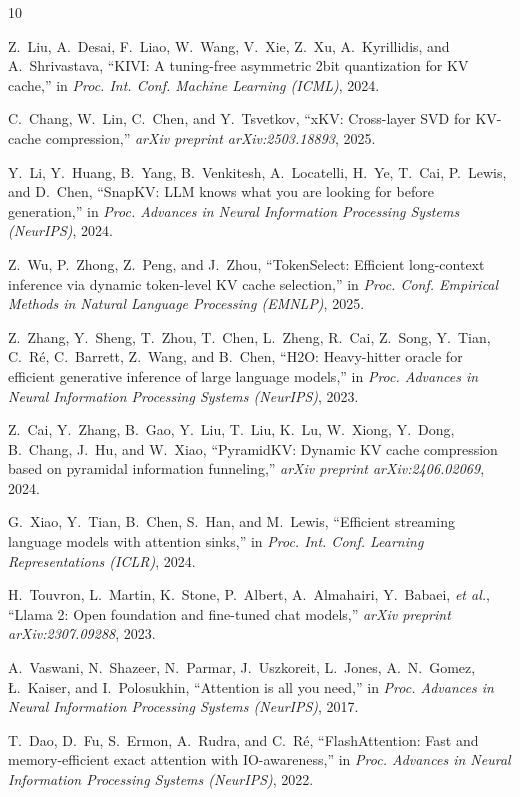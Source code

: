 \documentclass[conference]{IEEEtran}
\begin{document}
\begin{thebibliography}{10}

Z.~Liu, A.~Desai, F.~Liao, W.~Wang, V.~Xie, Z.~Xu, A.~Kyrillidis, and A.~Shrivastava, ``KIVI: A tuning-free asymmetric 2bit quantization for KV cache,'' in \textit{Proc. Int. Conf. Machine Learning (ICML)}, 2024.

C.~Chang, W.~Lin, C.~Chen, and Y.~Tsvetkov, ``xKV: Cross-layer SVD for KV-cache compression,'' \textit{arXiv preprint arXiv:2503.18893}, 2025.

Y.~Li, Y.~Huang, B.~Yang, B.~Venkitesh, A.~Locatelli, H.~Ye, T.~Cai, P.~Lewis, and D.~Chen, ``SnapKV: LLM knows what you are looking for before generation,'' in \textit{Proc. Advances in Neural Information Processing Systems (NeurIPS)}, 2024.

Z.~Wu, P.~Zhong, Z.~Peng, and J.~Zhou, ``TokenSelect: Efficient long-context inference via dynamic token-level KV cache selection,'' in \textit{Proc. Conf. Empirical Methods in Natural Language Processing (EMNLP)}, 2025.

Z.~Zhang, Y.~Sheng, T.~Zhou, T.~Chen, L.~Zheng, R.~Cai, Z.~Song, Y.~Tian, C.~R\'{e}, C.~Barrett, Z.~Wang, and B.~Chen, ``H2O: Heavy-hitter oracle for efficient generative inference of large language models,'' in \textit{Proc. Advances in Neural Information Processing Systems (NeurIPS)}, 2023.

Z.~Cai, Y.~Zhang, B.~Gao, Y.~Liu, T.~Liu, K.~Lu, W.~Xiong, Y.~Dong, B.~Chang, J.~Hu, and W.~Xiao, ``PyramidKV: Dynamic KV cache compression based on pyramidal information funneling,'' \textit{arXiv preprint arXiv:2406.02069}, 2024.

G.~Xiao, Y.~Tian, B.~Chen, S.~Han, and M.~Lewis, ``Efficient streaming language models with attention sinks,'' in \textit{Proc. Int. Conf. Learning Representations (ICLR)}, 2024.

H.~Touvron, L.~Martin, K.~Stone, P.~Albert, A.~Almahairi, Y.~Babaei, \textit{et al.}, ``Llama 2: Open foundation and fine-tuned chat models,'' \textit{arXiv preprint arXiv:2307.09288}, 2023.

A.~Vaswani, N.~Shazeer, N.~Parmar, J.~Uszkoreit, L.~Jones, A.~N.~Gomez, \L.~Kaiser, and I.~Polosukhin, ``Attention is all you need,'' in \textit{Proc. Advances in Neural Information Processing Systems (NeurIPS)}, 2017.

T.~Dao, D.~Fu, S.~Ermon, A.~Rudra, and C.~R\'{e}, ``FlashAttention: Fast and memory-efficient exact attention with IO-awareness,'' in \textit{Proc. Advances in Neural Information Processing Systems (NeurIPS)}, 2022.

\end{thebibliography}
\end{document}
